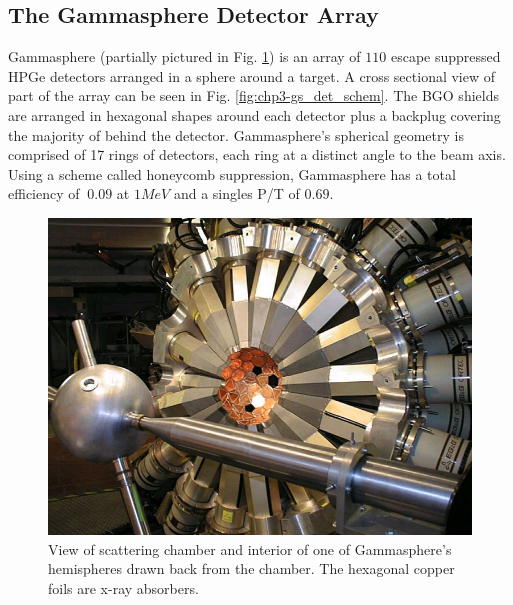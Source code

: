 \subsection{The Gammasphere Detector Array}
\label{ssec:exp-pr-gamma-gammasphere}
Gammasphere (partially pictured in Fig. \ref{fig:chp3-gs-hemisphere}) is an array of $110$ escape suppressed HPGe detectors arranged in a sphere around a target. A cross sectional view of part of the array can be seen in Fig. \ref{fig:chp3-gs_det_schem}. The BGO shields are arranged in hexagonal shapes around each detector plus a backplug covering the majority of behind the detector. Gammasphere's spherical geometry is comprised of 17 rings of detectors, each ring at a distinct angle to the beam axis. Using a scheme called honeycomb suppression, Gammasphere has a total efficiency of $~0.09$ at $1MeV$ and a singles P/T of $0.69$.

\begin{figure}[h]
	\centerline{\includegraphics[height=0.3\textheight]{./img/c3/gammasphere_hemi.jpg}}
	\caption{View of scattering chamber and interior of one of Gammasphere's hemispheres drawn back from the chamber. The hexagonal copper foils are x-ray absorbers.}
	\label{fig:chp3-gs-hemisphere}
\end{figure}


